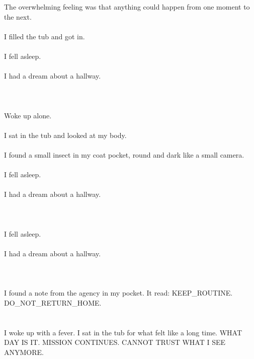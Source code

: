 \documentclass{article}
\begin{document}
    \section{}
    The overwhelming feeling was that anything could happen from one moment to the next.\\\\I filled the tub and got in.\\\\I fell asleep.\\\\I had a dream about a hallway.\\\\ 
    \newpage
    
    \section{}
    Woke up alone.\\\\I sat in the tub and looked at my body.\\\\I found a small insect in my coat pocket, round and dark like a small camera.\\\\I fell asleep.\\\\I had a dream about a hallway.\\\\ 
    \newpage
    
    \section{}
    I fell asleep.\\\\I had a dream about a hallway.\\\\ 
    \newpage
    
    \section{}
    I found a note from the agency in my pocket. It read: KEEP_ROUTINE. DO_NOT_RETURN_HOME.  
    \newpage
    
    \section{}
    I woke up with a fever. I sat in the tub for what felt like a long time. WHAT DAY IS IT. MISSION CONTINUES. CANNOT TRUST WHAT I SEE ANYMORE.  
    \newpage
    
\end{document}
